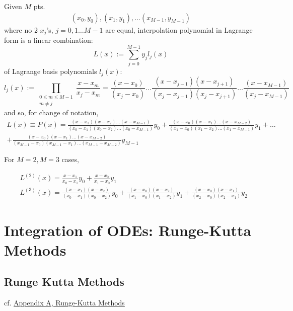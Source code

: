 \documentclass[10pt]{amsart}
\begin{document}
\begin{multicols*}{2}
Given $M$ pts.
\[
\begin{gathered}
	(x_0, y_0), (x_1, y_1), \dots (x_{M - 1}, y_{M- 1})
\end{gathered}
\]
where no 2 $x_j$'s, $j= 0, 1 \dots M-1$ are equal, interpolation polynomial in Lagrange form is a linear combination:
\begin{equation}
	L(x) := \sum_{j=0}^{M- 1} y_j l_j(x)
\end{equation}
of Lagrange basis polynomials $l_j(x)$:
\begin{equation}
	l_j(x) := \prod_{ \substack{ 0 \leq m \leq M - 1 \\ m \neq j } } \frac{ x - x_m}{ x_j - x_m } = \frac{ (x- x_0) }{ (x_j - x_0) } \dots \frac{ (x- x_{j-1}) ( x - x_{j+1} ) }{ (x_j - x_{j-1} ) ( x_j - x_{j+1} ) } \dots \frac{ (x- x_{M-1}) }{ (x_j - x_{M- 1})}
\end{equation}
and so, for change of notation,
\[
\begin{gathered}
	L(x) \equiv P(x) = \frac{ (x-x_1) (x-x_2) \dots (x-x_{M-1} ) }{ (x_0 - x_1) (x_0 - x_2) \dots (x_0 - x_{M-1})} y_0 + \frac{ (x-x_0) (x-x_1) \dots (x-x_{M-2} ) }{ (x_1 - x_0) (x_1 - x_2) \dots (x_1 - x_{M-1})} y_1 + \dots \\
	+ \frac{ (x-x_0) (x-x_1) \dots (x-x_{M-2} ) }{ (x_{M-1} - x_0) (x_{M-1} - x_1) \dots (x_{M-1} - x_{M-2})} y_{M - 1}
\end{gathered}
\]

For $M=2, M=3$ cases,

\[
\begin{aligned}
	& L^{(2)}(x) = \frac{ x - x_1}{x_0 - x_1} y_0 + \frac{ x- x_0 }{ x_1 - x_0} y_1 \\
	& L^{(3)}(x) = \frac{ (x - x_1)(x - x_2) }{ (x_0 - x_1) (x_0 - x_2) } y_0 + \frac{ (x - x_0)(x - x_2) }{ (x_1 - x_0) (x_1 - x_2) } y_1 + \frac{ (x- x_0)( x- x_1) }{ (x_2 - x_0)(x_2 - x_1)} y_2
\end{aligned}
\]


\section{Integration of ODEs: Runge-Kutta Methods}

\subsection{Runge Kutta Methods}

cf. \href{https://www.uni-muenster.de/imperia/md/content/physik_tp/lectures/ss2017/numerische_Methoden_fuer_komplexe_Systeme_II/rkm-1.pdf}{Appendix A, Runge-Kutta Methods}


\end{multicols*}
\end{document}
